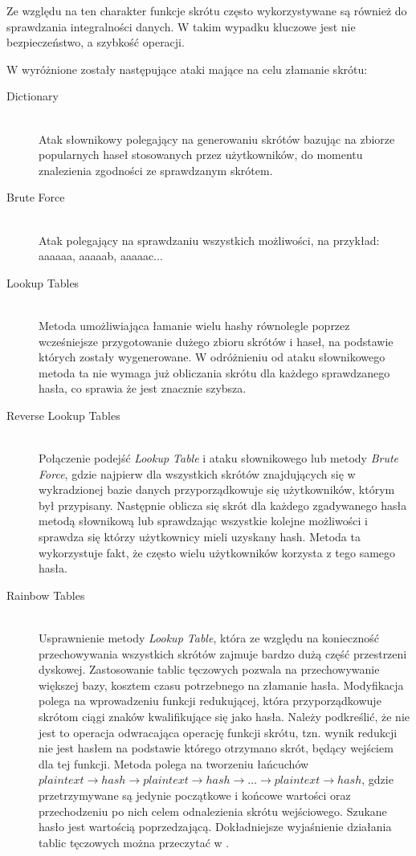 \documentclass[11pt]{aghdpl}
\begin{document}
Ze względu na ten charakter funkcje skrótu często wykorzystywane są również do sprawdzania integralności danych. W takim wypadku kluczowe jest nie bezpieczeństwo, a szybkość operacji.

W \cite{CSH} wyróżnione zostały następujące ataki mające na celu złamanie skrótu:
\begin{description}
\item[Dictionary] \hfill \\
Atak słownikowy polegający na generowaniu skrótów bazując na zbiorze popularnych haseł stosowanych przez użytkowników, do momentu znalezienia zgodności ze sprawdzanym skrótem.
\item[Brute Force] \hfill \\
Atak polegający na sprawdzaniu wszystkich możliwości, na przykład: aaaaaa, aaaaab, aaaaac...
\item[Lookup Tables] \hfill \\
Metoda umożliwiająca łamanie wielu hashy równolegle poprzez wcześniejsze przygotowanie dużego zbioru skrótów i haseł, na podstawie których zostały wygenerowane. W odróżnieniu od ataku słownikowego metoda ta nie wymaga już obliczania skrótu dla każdego sprawdzanego hasła, co sprawia że jest znacznie szybsza.
\item[Reverse Lookup Tables] \hfill \\
Połączenie podejść \emph{Lookup Table} i ataku słownikowego lub metody \emph{Brute Force}, gdzie najpierw dla wszystkich skrótów znajdujących się w wykradzionej bazie danych przyporządkowuje się użytkowników, którym był przypisany. Następnie oblicza się skrót dla każdego zgadywanego hasła metodą słownikową lub sprawdzając wszystkie kolejne możliwości i sprawdza się którzy użytkownicy mieli uzyskany hash. Metoda ta wykorzystuje fakt, że często wielu użytkowników korzysta z tego samego hasła.
\item[Rainbow Tables] \hfill \\
Usprawnienie metody \emph{Lookup Table}, która ze względu na konieczność przechowywania wszystkich skrótów zajmuje bardzo dużą część przestrzeni dyskowej. Zastosowanie tablic tęczowych pozwala na przechowywanie większej bazy, kosztem czasu potrzebnego na złamanie hasła. Modyfikacja polega na wprowadzeniu funkcji redukującej, która przyporządkowuje skrótom ciągi znaków kwalifikujące się jako hasła. Należy podkreślić, że nie jest to operacja odwracająca operację funkcji skrótu, tzn. wynik redukcji nie jest hasłem na podstawie którego otrzymano skrót, będący wejściem dla tej funkcji. Metoda polega na tworzeniu łańcuchów $plaintext \rightarrow hash \rightarrow plaintext \rightarrow hash \rightarrow \ldots \rightarrow plaintext \rightarrow hash$, gdzie przetrzymywane są jedynie początkowe i końcowe wartości oraz przechodzeniu po nich celem odnalezienia skrótu wejściowego. Szukane hasło jest wartością poprzedzającą. Dokładniejsze wyjaśnienie działania tablic tęczowych można przeczytać w \cite{RT}.
\end{description}
\end{document}

